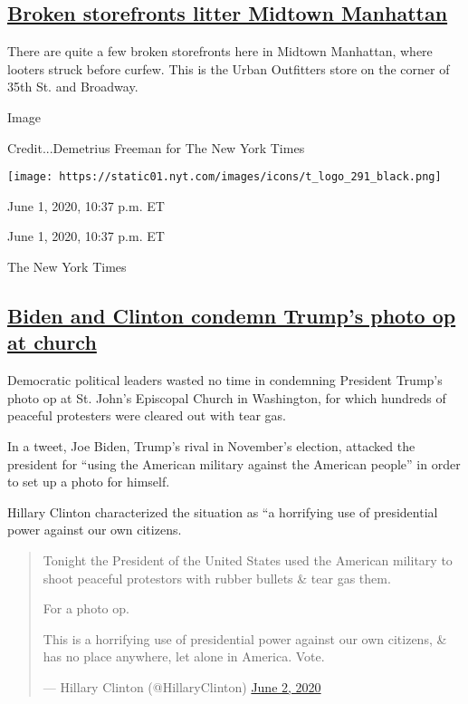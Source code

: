 \hypertarget{broken-storefronts-litter-midtown-manhattan}{%
\subsection{\texorpdfstring{\protect\hyperlink{broken-storefronts-litter-midtown-manhattan}{Broken
storefronts litter Midtown
Manhattan}}{Broken storefronts litter Midtown Manhattan}}\label{broken-storefronts-litter-midtown-manhattan}}

There are quite a few broken storefronts here in Midtown Manhattan,
where looters struck before curfew. This is the Urban Outfitters store
on the corner of 35th St. and Broadway.

Image

Credit...Demetrius Freeman for The New York Times

\texttt{[image: https://static01.nyt.com/images/icons/t\_logo\_291\_black.png]}

June 1, 2020, 10:37 p.m. ET

June 1, 2020, 10:37 p.m. ET

The New York Times

\hypertarget{biden-and-clinton-condemn-trumps-photo-op-at-church}{%
\subsection{\texorpdfstring{\protect\hyperlink{biden-and-clinton-condemn-trumps-photo-op-at-church}{Biden
and Clinton condemn Trump's photo op at
church}}{Biden and Clinton condemn Trump's photo op at church}}\label{biden-and-clinton-condemn-trumps-photo-op-at-church}}

Democratic political leaders wasted no time in condemning President
Trump's photo op at St. John's Episcopal Church in Washington, for which
hundreds of peaceful protesters were cleared out with tear gas.

In a tweet, Joe Biden, Trump's rival in November's election, attacked
the president for ``using the American military against the American
people'' in order to set up a photo for himself.

Hillary Clinton characterized the situation as ``a horrifying use of
presidential power against our own citizens.

\begin{quote}
Tonight the President of the United States used the American military to
shoot peaceful protestors with rubber bullets \& tear gas them.

For a photo op.

This is a horrifying use of presidential power against our own citizens,
\& has no place anywhere, let alone in America. Vote.

--- Hillary Clinton (@HillaryClinton)
\href{https://twitter.com/HillaryClinton/status/1267642131998441473?ref_src=twsrc\%5Etfw}{June
2, 2020}
\end{quote}


